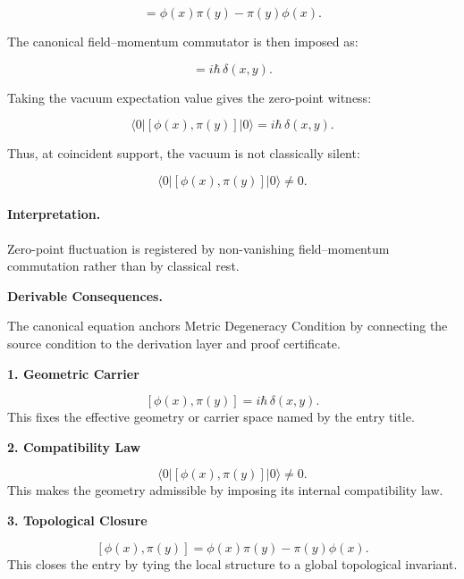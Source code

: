 \begin{equation}
[\phi(x),\pi(y)]
=
\phi(x)\pi(y)-\pi(y)\phi(x).
\end{equation}

The canonical field--momentum commutator is then imposed as:

\begin{equation}
[\phi(x),\pi(y)] = i\hbar\,\delta(x,y).
\end{equation}

Taking the vacuum expectation value gives the zero-point witness:

\begin{equation}
\langle 0|[\phi(x),\pi(y)]|0\rangle
=
i\hbar\,\delta(x,y).
\end{equation}

Thus, at coincident support, the vacuum is not classically silent:

\begin{equation}
\boxed{
\langle 0|[\phi(x),\pi(y)]|0\rangle \neq 0 .
}
\end{equation}

\paragraph{Interpretation.}
Zero-point fluctuation is registered by non-vanishing field--momentum commutation rather than by classical rest.

\par\vspace{0.35em}
\noindent\textbf{Derivable Consequences.}\quad
\begingroup
\footnotesize
\raggedright
The canonical equation anchors Metric Degeneracy Condition by connecting the source condition to the derivation layer and proof certificate.
\par\endgroup

\noindent\textbf{1. Geometric Carrier}\par
\[
[\phi(x),\pi(y)] = i\hbar\,\delta(x,y).
\]
\noindent This fixes the effective geometry or carrier space named by the entry title.\par
\noindent\textbf{2. Compatibility Law}\par
\[
\langle 0|[\phi(x),\pi(y)]|0\rangle \neq 0.
\]
\noindent This makes the geometry admissible by imposing its internal compatibility law.\par
\noindent\textbf{3. Topological Closure}\par
\[
[\phi(x),\pi(y)] = \phi(x)\pi(y)-\pi(y)\phi(x).
\]
\noindent This closes the entry by tying the local structure to a global topological invariant.\par

